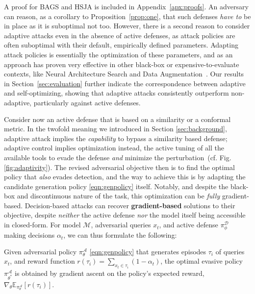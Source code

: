 A proof for BAGS and HSJA is included in Appendix~\ref{apx:proofs}.
An adversary can reason, as a corollary to Proposition~\ref{prop:one}, that such defenses \emph{have to} be in place as it is suboptimal not too.
However, there is a second reason to consider adaptive attacks even in the absence of active defenses, as attack policies are often suboptimal with their default, empirically defined parameters.
Adapting attack policies is essentially the optimization of these parameters, and as an approach has proven very effective in other black-box or expensive-to-evaluate contexts, like Neural Architecture Search and Data Augmentation~\cite{zoph2016neural, pham2021autodropout, tsingenopoulos2024train}.
Our results in Section~\ref{sec:evaluation} further indicate the correspondence between adaptive and self-optimizing, showing that adaptive attacks consistently outperform non-adaptive, particularly against active defenses.

Consider now an active defense that is based on a similarity or a conformal metric.
In the twofold meaning we introduced in Section \ref{sec:background}, adaptive attack implies the \textit{capability} to bypass a similarity based defense; adaptive control implies optimization instead, the active tuning of all the available tools to evade the defense \textit{and} minimize the perturbation~(cf. Fig. \ref{fig:adaptivity}).
The revised adversarial objective then is to find the optimal policy that \emph{also} evades detection, and the way to achieve this is by adapting the candidate generation policy \eqref{eqn:genpolicy} itself.
Notably, and despite the black-box and discontinuous nature of the task, this optimization can be \emph{fully} gradient-based.
Decision-based attacks can recover \textbf{gradient-based} solutions to their objective, despite \emph{neither} the active defense \emph{nor} the model itself being accessible in closed-form.
For model $\mathcal{M}$, adversarial queries $x_t$, and active defense $\pi_\phi^{\mathcal{D}}$ making decisions $\alpha_t$, we can thus formulate the following:

\begin{proposition}
Given adversarial policy $\pi_\theta^\mathcal{A}$ \eqref{eqn:genpolicy} that generates episodes $\tau_i$ of queries $x_t$, and reward function $r(\tau_i) = \sum_{x_t \in \tau_i} (1 - \alpha_t)$, the optimal evasive policy ${\pi^\mathcal{A}_{\theta^*}}$ is obtained by gradient ascent on the policy's expected reward, $\nabla_\theta \mathbb{E}_{\pi_\theta^{\mathcal{A}}} [r(\tau_i)]$.
\label{th:epg}
\end{proposition}

